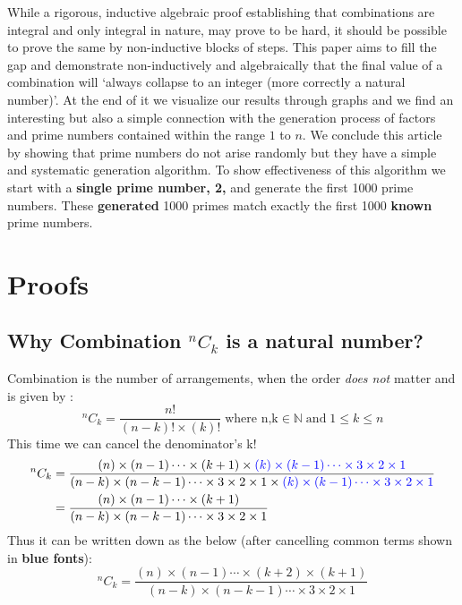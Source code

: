 \documentclass[10pt, twoside]{article}
\newcommand*{\Combination}[2]{{}^{#1}C_{#2}}%
\begin{document}
	While a rigorous, inductive algebraic proof establishing that combinations are integral and only integral in nature, may prove to be hard, it should be possible to prove the same by non-inductive blocks of steps. This paper aims to fill the gap and demonstrate non-inductively and algebraically that the final value of a combination will `always collapse to an integer (more correctly a natural number)'. At the end of it we visualize our results through graphs and we find an interesting but also a simple connection with the generation process of factors and prime numbers contained within the range $1$ to $n$. We conclude this article by showing that prime numbers do not arise randomly but they have a simple and systematic generation algorithm. To show effectiveness of this algorithm we start with a \textbf{single prime number, 2,} and generate the first 1000 prime numbers. These \textbf{generated} 1000 primes match exactly the first 1000 \textbf{known} prime numbers.
	\section{Proofs}
 	\subsection{Why Combination $\Combination{n}{k}$ is a natural number?}
 	Combination is the number of arrangements, when the order \textit{does not} matter and is given by \cite{PrincTechCombinatorics}:\newline
 	\begin{equation}
 		\Combination{n}{k} = \frac{n!}{(n-k)!\times(k)!} \; \text{where n,k} \in \mathbb{N} \; \text{and} \; 1 \leq k \leq n
 	\end{equation}
 	This time we can cancel the denominator's k!
 	\begin{align*}
 		\Combination{n}{k} &= \frac{(n)\times(n-1)\cdots\times(k+1)\times\color{blue}(k)\times(k-1)\cdots\times3\times2\times1}{(n-k)\times(n-k-1)\cdots\times3\times2\times1\times\color{blue}(k)\times(k-1)\cdots\times3\times2\times1}\\
 		&= \frac{(n)\times(n-1)\cdots\times(k+1)}{(n-k)\times(n-k-1)\cdots\times3\times2\times1}
 	\end{align*}
 Thus it can be written down as the below (after cancelling common terms shown in \textbf{\color{blue}blue fonts}):
 \begin{equation}
 	\Combination{n}{k} = \frac{(n)\times(n-1)\cdots\times(k+2)\times(k+1)}{(n-k)\times(n-k-1)\cdots\times3\times2\times1} \label{reducedCombinationForm}
 \end{equation}
\end{document}
